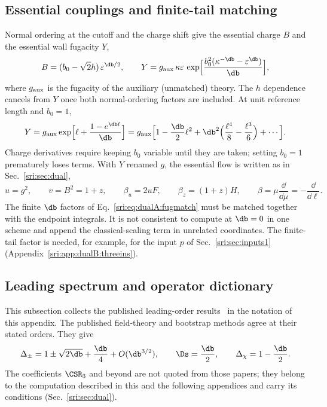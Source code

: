\subsection{Essential couplings and finite-tail matching}\label{sri:app:dualA:matching}
Normal ordering at the cutoff and the charge shift give the essential charge $B$ and the essential wall fugacity
$Y$,
\begin{equation}
 B=(b_0-\sqrt2h)\,\varepsilon^{\db/2},\qquad
 Y=g_{\rm aux}\,\kappa\varepsilon\,\exp\Bigl[\frac{b_0^2(\kappa^{-\db}-\varepsilon^{\db})}{\db}\Bigr],
 \label{sri:eq:dualA:matching}
\end{equation}
where $g_{\rm aux}$ is the fugacity of the auxiliary (unmatched) theory. The $h$ dependence cancels from $Y$ once
both normal-ordering factors are included. At unit reference length and $b_0=1$,
\begin{equation}
 Y=g_{\rm aux}\exp\Bigl[\ell+\frac{1-e^{\db\ell}}{\db}\Bigr]
 =g_{\rm aux}\Bigl[1-\frac{\db}{2}\ell^2+\db^2\Bigl(\frac{\ell^4}{8}-\frac{\ell^3}{6}\Bigr)+\cdots\Bigr].
 \label{sri:eq:dualA:fugmatch}
\end{equation}
Charge derivatives require keeping $b_0$ variable until they are taken; setting $b_0=1$ prematurely loses terms.
With $Y$ renamed $g$, the essential flow is written as in Sec.~\ref{sri:sec:dual},
\begin{equation}
 u=g^2,\qquad v=B^2=1+z,\qquad \beta_u=2uF,\qquad \beta_z=(1+z)H,\qquad
 \beta=\mu\frac{\dd}{\dd\mu}=-\frac{\dd}{\dd\ell}.
 \label{sri:eq:dualA:essential}
\end{equation}
The finite $\db$ factors of Eq.~\eqref{sri:eq:dualA:fugmatch} must be matched together with the endpoint integrals. It
is not consistent to compute at $\db=0$ in one scheme and append the classical-scaling term in unrelated coordinates. The
finite-tail factor is needed, for example, for the input $p$ of Sec.~\ref{sri:sec:inputs1} (Appendix~\ref{sri:app:dualB:threeins}).

\subsection{Leading spectrum and operator dictionary}\label{sri:app:dualA:dictionary}
This subsection collects the published leading-order results~\cite{sri:Benedetti:2024wgx,sri:Benedetti:2025nzp} in the
notation of this appendix. The published field-theory and bootstrap methods agree at their stated orders. They give
\begin{equation}
 \Delta_\pm=1\pm\sqrt{2\db}+\frac{\db}{4}+O(\db^{3/2}),\qquad \Ds=\frac{\db}{2},\qquad \Delta_\chi=1-\frac{\db}{2}.
 \label{sri:eq:dualA:published}
\end{equation}
The coefficients $\CSR_3$ and beyond are not quoted from those papers; they belong to the computation described in
this and the following appendices and carry its conditions (Sec.~\ref{sri:sec:dual}).

